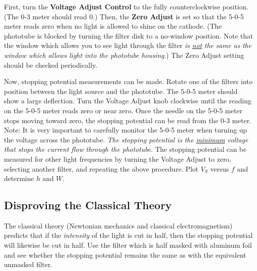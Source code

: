 First, turn the \textbf{Voltage Adjust Control} to the fully counterclockwise position. (The 0-3 meter should read 0.) Then, the \textbf{Zero Adjust} is set so that the 5-0-5 meter reads zero when no light is allowed to shine on the cathode. (The phototube is blocked by turning the filter disk to a no-window position. Note that the window which allows you to see light through the filter \emph{is \underline{not} the same as the window which allows light into the phototube housing}.) The Zero Adjust setting should be checked periodically. \myskip

Now, stopping potential measurements can be made. Rotate one of the filters into position between the light source and the phototube. The 5-0-5 meter should show a large deflection. Turn the Voltage Adjust knob clockwise until the reading on the 5-0-5 meter reads zero or near zero. Once the needle on the 5-0-5 meter stops moving toward zero, the stopping potential can be read from the 0-3 meter. Note: It is very important to carefully monitor the 5-0-5 meter when turning up the voltage across the phototube. \emph{The stopping potential is the \underline{minimum} voltage that stops the current flow through the phototube}. The stopping potential can be measured for other light frequencies by turning the Voltage Adjust to zero, selecting another filter, and repeating the above procedure. Plot $V_{S}$ versus $f$ and determine $h$ and $W$.

\subsection{Disproving the Classical Theory}
The classical theory (Newtonian mechanics and classical electromagnetism) predicts that if the \emph{intensity} of the light is cut in half, then the stopping potential will likewise be cut in half. Use the filter which is half masked with aluminum foil and see whether the stopping potential remains the same as with the equivalent unmasked filter. \myskip

